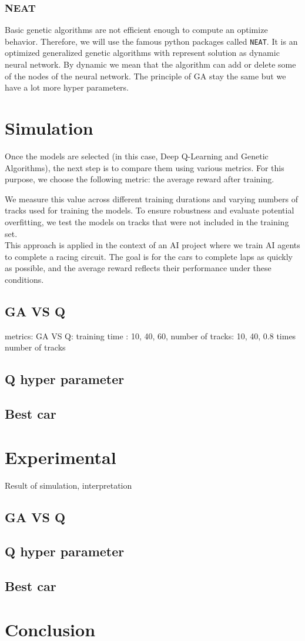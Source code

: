 \documentclass[11pt,a4paper]{article}
\begin{document}
			\subsubsection{NEAT}
Basic genetic algorithms are not efficient enough to compute an optimize behavior. Therefore, we will use the famous python packages called \texttt{NEAT}. It is an optimized generalized genetic algorithms with represent solution as dynamic neural network. By dynamic we mean that the algorithm can add or delete some of the nodes of the neural network. The principle of GA stay the same but we have a lot more hyper parameters.
	
	
	\section*{Simulation}
Once the models are selected (in this case, Deep Q-Learning and Genetic Algorithms), the next step is to compare them using various metrics. For this purpose, we choose the following metric: the average reward after training.

We measure this value across different training durations and varying numbers of tracks used for training the models. To ensure robustness and evaluate potential overfitting, we test the models on tracks that were not included in the training set.\\
This approach is applied in the context of an AI project where we train AI agents to complete a racing circuit. The goal is for the cars to complete laps as quickly as possible, and the average reward reflects their performance under these conditions.

		\subsection{GA VS Q}
metrics: GA VS Q: training time : 10, 40, 60, number of tracks: 10, 40, 0.8 times number of tracks
		
		\subsection{Q hyper parameter}
		
		\subsection{Best car}

	
	\section*{Experimental}
Result of simulation, interpretation
		\subsection{GA VS Q}
		
		\subsection{Q hyper parameter}
		
		\subsection{Best car}



    \section*{Conclusion}
	
\end{document}
